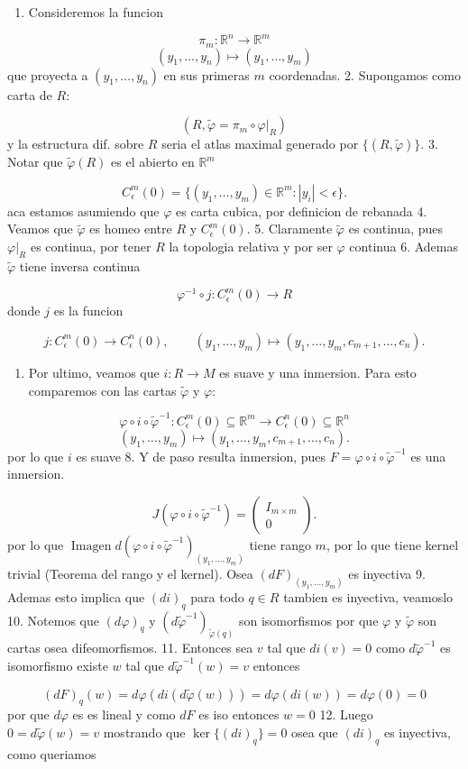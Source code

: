\begin{bookproof}{}
\begin{enumerate}
\item Consideremos la funcion
\end{enumerate}
\[
\pi_m:\mathbb R^n\to\mathbb R^m
\]
\[
(y_1,\ldots,y_n)\mapsto(y_1,\ldots,y_m)
\]
que proyecta a $(y_1,\ldots,y_n)$ en sus primeras $m$ coordenadas. 2. Supongamos como carta de $R$:

\[
(R,\widetilde\varphi=\pi_m\circ\varphi|_R)
\]
y la estructura dif. sobre $R$ seria el atlas maximal generado por $\{(R,\widetilde\varphi)\}$. 3. Notar que $\widetilde\varphi(R)$ es el abierto en $\mathbb R^m$

\[
C_\epsilon^m(0)=\{(y_1,\ldots,y_m)\in\mathbb R^m:|y_i|<\epsilon\}.
\]
aca estamos asumiendo que $\varphi$ es carta cubica, por definicion de rebanada 4. Veamos que $\widetilde\varphi$ es homeo entre $R$ y $C_\epsilon^m(0)$. 5. Claramente $\widetilde\varphi$ es continua, pues $\varphi|_R$ es continua, por tener $R$ la topologia relativa y por ser $\varphi$ continua 6. Ademas $\widetilde{\varphi}$ tiene inversa continua

\[
\varphi^{-1}\circ j:C_\epsilon^m(0)\to R
\]
donde $j$ es la funcion

\[
j:C_\epsilon^m(0)\to C_\epsilon^n(0),\qquad (y_1,\ldots,y_m)\mapsto(y_1,\ldots,y_m,c_{m+1},\ldots,c_n).
\]
\begin{enumerate}[start=7]
\item Por ultimo, veamos que $i:R\to M$ es suave y una inmersion. Para esto comparemos con las cartas $\widetilde\varphi$ y $\varphi$:
\end{enumerate}
\[
\varphi\circ i\circ\widetilde\varphi^{-1}:C_\epsilon^m(0)\subseteq\mathbb R^m\to C_\epsilon^n(0)\subseteq\mathbb R^n
\]
\[
(y_1,\ldots,y_m)\mapsto(y_1,\ldots,y_m,c_{m+1},\ldots,c_n).
\]
por lo que $i$ es suave 8. Y de paso resulta inmersion, pues $F=\varphi\circ i\circ\widetilde\varphi^{-1}$ es una inmersion.

\[
J(\varphi\circ i\circ\widetilde\varphi^{-1})=\begin{pmatrix}I_{m\times m}\\0\end{pmatrix}.
\]
por lo que $\operatorname{Imagen} d(\varphi\circ i\circ\widetilde\varphi^{-1})_{(y_1,\ldots,y_m)}$ tiene rango $m$, por lo que tiene kernel trivial (Teorema del rango y el kernel). Osea $(dF)_{(y_{1},\ldots,y_{m})}$ es inyectiva 9. Ademas esto implica que $(di)_q$ para todo $q\in R$ tambien es inyectiva, veamoslo 10. Notemos que $(d\varphi)_q\text{ y }(d\widetilde\varphi^{-1})_{\widetilde\varphi(q)}$ son isomorfismos por que $\varphi$ y $\widetilde{\varphi}$ son cartas osea difeomorfismos. 11. Entonces sea $v$ tal que $di(v)=0$ como $d \tilde{\varphi}^{-1}$ es isomorfismo existe $w$ tal que $d \tilde{\varphi}^{-1}(w)=v$ entonces

\[
(dF)_{q}(w)=d\varphi(di(d \tilde{\varphi}(w)))=d\varphi(di(w))=d\varphi(0)=0
\]
por que $d\varphi$ es es lineal y como $dF$ es iso entonces $w=0$ 12. Luego $0=d \tilde{\varphi}(w)=v$ mostrando que $\ker\{ (di)_{q} \}=0$ osea que $(di)_{q}$ es inyectiva, como queriamos

\bookqed
\end{bookproof}
